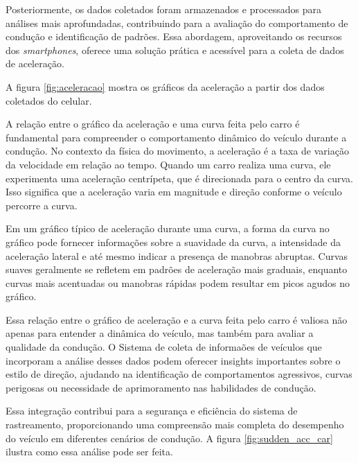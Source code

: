 Posteriormente, os dados coletados foram armazenados e processados para análises mais aprofundadas, contribuindo para a avaliação do comportamento de condução e identificação de padrões. Essa abordagem, aproveitando os recursos dos \textit{smartphones}, oferece uma solução prática e acessível para a coleta de dados de aceleração.

A figura \ref{fig:aceleracao} mostra os gráficos da aceleração a partir dos dados coletados do celular. 

A relação entre o gráfico da aceleração e uma curva feita pelo carro é fundamental para compreender o comportamento dinâmico do veículo durante a condução. No contexto da física do movimento, a aceleração é a taxa de variação da velocidade em relação ao tempo. Quando um carro realiza uma curva, ele experimenta uma aceleração centrípeta, que é direcionada para o centro da curva. Isso significa que a aceleração varia em magnitude e direção conforme o veículo percorre a curva.

Em um gráfico típico de aceleração durante uma curva, a forma da curva no gráfico pode fornecer informações sobre a suavidade da curva, a intensidade da aceleração lateral e até mesmo indicar a presença de manobras abruptas. Curvas suaves geralmente se refletem em padrões de aceleração mais graduais, enquanto curvas mais acentuadas ou manobras rápidas podem resultar em picos agudos no gráfico.

Essa relação entre o gráfico de aceleração e a curva feita pelo carro é valiosa não apenas para entender a dinâmica do veículo, mas também para avaliar a qualidade da condução. O Sistema de coleta de informaões de veículos que incorporam a análise desses dados podem oferecer insights importantes sobre o estilo de direção, ajudando na identificação de comportamentos agressivos, curvas perigosas ou necessidade de aprimoramento nas habilidades de condução. 

Essa integração contribui para a segurança e eficiência do sistema de rastreamento, proporcionando uma compreensão mais completa do desempenho do veículo em diferentes cenários de condução. A figura \ref{fig:sudden_acc_car} ilustra como essa análise pode ser feita.


